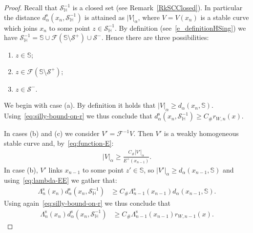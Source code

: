 \documentclass[AHL, Unicode, longabstracts,published]{cedram}
\newcommand{\const}{C_\#}
\newcommand{\inv}{^{-1}}
\newcommand{\stable}{\text{s}}
\newcommand{\hhs}{\mathbb{S}}
\newcommand{\homo}{\mathbb{H}}
\newcommand{\cm}{\mathcal{F}}
\newcommand{\dadm}[1]{\dadmPrivate^{#1}}
\newcommand{\dadmPrivate}{d\adm}
\newcommand{\ds}{\dadmPrivate^{\stable}}
\newcommand{\singPrivate}{\mathcal{S}}
\newcommand{\hsing}[1]{{\singPrivate}_\homo^{#1}}
\newcommand{\singForward}[1]{\singPrivate^+_{#1}}
\newcommand{\singBackward}[1]{\singPrivate^-_{#1}}
\newcommand{\adm}{_{\alpha^{+}}}
\newcommand*\DS{\displaystyle}
\renewcommand{\adm}{_{\alpha}}
\renewcommand{\dadm}{d\adm}
\newcommand*{\relabel}{\renewcommand{\labelenumi}{(\theenumi)}}
\newcommand*{\alphenumi}{\renewcommand*{\theenumi}{\alph{enumi}}\relabel}
\begin{document}
\begin{proof}
Recall that $\hsing{-1}$ is a closed set (see Remark~\ref{RkSCClosed}). In particular the distance $\ds(x_{n},\hsing{-1})$ is attained as $|V|\adm$, where $V = V(x_{n})$ is a stable curve which joins $x_{n}$ to some point $z\in\hsing{-1}$. By definition (see~\eqref{e_definitionHSing}) we have $\DS \hsing{-1} = \hhs \cup \cm(\hhs\setminus\singForward{}) \cup \singBackward{}. $ Hence there are three possibilities:
\begin{enumerate}\alphenumi
\item\label{prf7.9.a} $z\in\hhs$; 
\item\label{prf7.9.b} $z\in\cm(\hhs\setminus\singForward{})$; 
\item\label{prf7.9.c} $z\in\singBackward{}$.
\end{enumerate}

We begin with case (a). By definition it holds that $|V|\adm\ge \dadm(x_{n},\hhs)$. Using~\eqref{eq:silly-bound-on-r} we thus conclude that $\ds(x_n,\hsing{-1})\ge \const r_{W,n}(x)$.

In cases (b) and (c) we consider $V' = \cm\inv V$. Then $V'$ is a weakly homogeneous stable curve and, by~\eqref{eq:function-E}:
\begin{align*}
|V|\adm\ge \frac{\const |V'|\adm}{E^{+}(x_{n-1})}.
\end{align*}
In case (b), $V'$ links $x_{n-1}$ to some point $z'\in\hhs$, so $|V'|\adm\ge\dadm(x_{n-1},\hhs)$ and using~\eqref{eq:lambda-EE} we gather that:
\begin{align*}
\Lambda^{\stable}_{n}(x_{n})\ds(x_{n},\hsing{-1})&\ge \const\Lambda^{\stable}_{n-1}(x_{n-1})\dadm(x_{n-1},\hhs).
\end{align*}
Using again~\eqref{eq:silly-bound-on-r} we thus conclude that
\begin{align*}
\Lambda^{\stable}_{n}(x_{n})\ds\left(x_{n},\hsing{-1}\right)&\ge \const\Lambda^{\stable}_{n-1}(x_{n-1})r_{W,n-1}(x).
\end{align*}


\end{proof}
\end{document}
